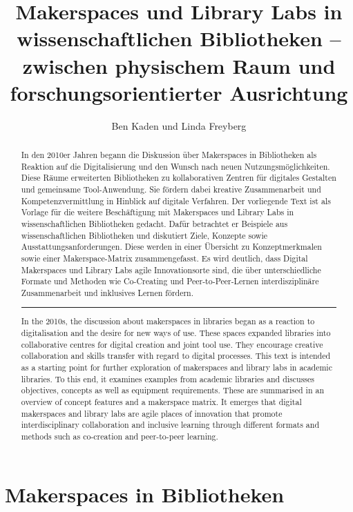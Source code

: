 \documentclass[a4paper,
fontsize=11pt,
oneside,
numbers=noperiodatend,
parskip=half-,
bibliography=totoc,
final
]{scrartcl}
\title{\LARGE{Makerspaces und Library Labs in wissenschaftlichen Bibliotheken -- zwischen physischem Raum und forschungsorientierter Ausrichtung}}%
\author{Ben Kaden und Linda Freyberg} %
\date{}
\begin{document}
\maketitle
\thispagestyle{fancyplain} 

\begin{abstract}
\noindent
In den 2010er Jahren begann die Diskussion über Makerspaces in
Bibliotheken als Reaktion auf die Digitalisierung und den Wunsch nach
neuen Nutzungsmöglichkeiten. Diese Räume erweiterten Bibliotheken zu
kollaborativen Zentren für digitales Gestalten und gemeinsame
Tool-Anwendung. Sie fördern dabei kreative Zusammenarbeit und
Kompetenzvermittlung in Hinblick auf digitale Verfahren. Der vorliegende
Text ist als Vorlage für die weitere Beschäftigung mit Makerspaces und
Library Labs in wissenschaftlichen Bibliotheken gedacht. Dafür
betrachtet er Beispiele aus wissenschaftlichen Bibliotheken und
diskutiert Ziele, Konzepte sowie Ausstattungsanforderungen. Diese werden
in einer Übersicht zu Konzeptmerkmalen sowie einer Makerspace-Matrix
zusammengefasst. Es wird deutlich, dass Digital Makerspaces und Library
Labs agile Innovationsorte sind, die über unterschiedliche Formate und
Methoden wie Co-Creating und Peer-to-Peer-Lernen interdisziplinäre
Zusammenarbeit und inklusives Lernen fördern.

\begin{center}\rule{0.5\linewidth}{0.5pt}\end{center}

In the 2010s, the discussion about makerspaces in libraries began as a
reaction to digitalisation and the desire for new ways of use. These
spaces expanded libraries into collaborative centres for digital
creation and joint tool use. They encourage creative collaboration and
skills transfer with regard to digital processes. This text is intended
as a starting point for further exploration of makerspaces and library
labs in academic libraries. To this end, it examines examples from
academic libraries and discusses objectives, concepts as well as
equipment requirements. These are summarised in an overview of concept
features and a makerspace matrix. It emerges that digital makerspaces
and library labs are agile places of innovation that promote
interdisciplinary collaboration and inclusive learning through different
formats and methods such as co-creation and peer-to-peer learning.
\end{abstract}

\hypertarget{makerspaces-in-bibliotheken}{%
\section{Makerspaces in
Bibliotheken}\label{makerspaces-in-bibliotheken}}
\end{document}
